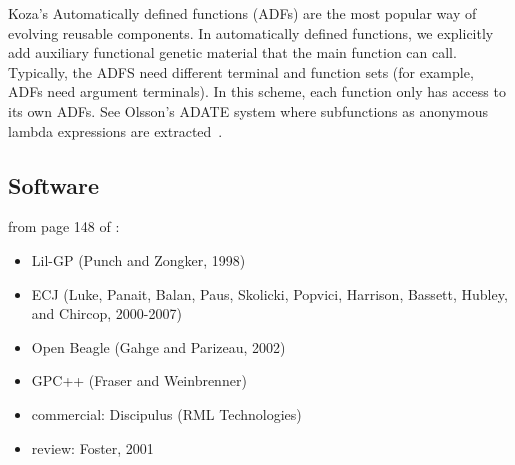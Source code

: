 \documentclass{article}
\begin{document}
Koza's Automatically defined functions (ADFs) are the most popular way of
evolving reusable components. In automatically defined functions, we explicitly
add auxiliary functional genetic material that the main function can call.
Typically, the ADFS need different terminal and function sets (for example,
ADFs need argument terminals). In this scheme, each function only has access to
its own ADFs. See Olsson's ADATE system where subfunctions as anonymous lambda
expressions are extracted~\cite{DBLP:conf/eurogp/Olsson9}.

\subsection{Software}
from page 148 of \cite{poli08:fieldguide}:
\begin{itemize}
\item Lil-GP (Punch and Zongker, 1998)
\item ECJ (Luke, Panait, Balan, Paus, Skolicki, Popvici, Harrison, Bassett,
Hubley, and Chircop, 2000-2007)
\item Open Beagle (Gahge and Parizeau, 2002)
\item GPC++ (Fraser and Weinbrenner)
\item commercial: Discipulus (RML Technologies)
\item review: Foster, 2001 
\end{itemize}



\end{document}
